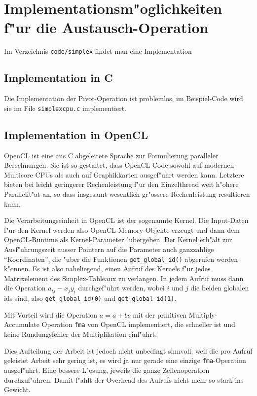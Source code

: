 \section{Implementationsm"oglichkeiten f"ur die Austausch-Operation}
Im Verzeichnis {\tt code/simplex} findet man eine Implementation
\subsection{Implementation in C}
Die Implementation der Pivot-Operation ist problemlos, im Beispiel-Code
wird sie im File {\tt simplexcpu.c} implementiert.

\subsection{Implementation in OpenCL}
OpenCL ist eine aus C abgeleitete Sprache zur Formulierung paralleler
Berechnungen. Sie ist so gestaltet, dass OpenCL Code sowohl auf 
modernen Multicore CPUs als auch auf Graphikkarten ausgef"uhrt
werden kann. Letztere bieten bei leicht geringerer
Rechenleistung f"ur den Einzelthread weit h"ohere Parallelit"at an,
so dass insgesamt wesentlich gr"ossere Rechenleistung resultieren kann.

Die Verarbeitungseinheit in OpenCL ist der sogenannte Kernel.
Die Input-Daten f"ur den Kernel werden also OpenCL-Memory-Objekte
erzeugt und dann dem OpenCL-Runtime als Kernel-Parameter "ubergeben.
Der Kernel erh"alt zur Ausf"uhrungszeit ausser Pointern auf die 
Parameter auch ganzzahlige ``Koordinaten'', die "uber die
Funktionen \verb+get_global_id()+ abgerufen werden k"onnen.
Es ist also naheliegend, einen Aufruf des Kernels f"ur jedes
Matrixelement des Simplex-Tableaux zu verlangen. In jedem
Aufruf muss dann die Operation $a_{ij}-x_jy_i$
durchgef"uhrt werden, wobei $i$ und $j$ die beiden
globalen ids sind, also
\verb+get_global_id(0)+ und
\verb+get_global_id(1)+.

Mit Vorteil wird die Operation $a=a+bc$ mit der prmitiven Multiply-Accumulate
Operation {\tt fma} von OpenCL implementiert, die schneller ist und
keine Rundungsfehler der Multiplikation einf"uhrt.

Dies Aufteilung der Arbeit ist jedoch nicht unbedingt sinnvoll,
weil die pro Aufruf geleistet Arbeit sehr gering ist, es wird ja nur
gerade eine einzige {\tt fma}-Operation ausgef"uhrt.
Eine bessere L"osung, jeweils die ganze Zeilenoperation durchzuf"uhren.
Damit f"ahlt der Overhead des Aufrufs nicht mehr so stark ins Gewicht.

